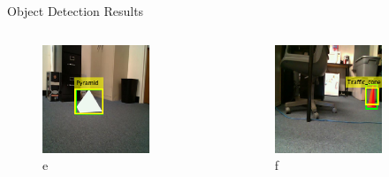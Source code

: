 \documentclass[10pt]{beamer}
\begin{document}
\begin{frame}{Object Detection Results}
\begin{columns}
\begin{figure}
         \includegraphics[width=0.75\textwidth]{Images/tt5.png}
         \caption{e}
     \end{figure}
     \vspace{-10pt}
     \begin{figure}
         \centering
         \includegraphics[width=0.75\textwidth]{Images/tt6.png}
         \caption{f}
     \end{figure}  
\end{columns}   
\end{frame}
\end{document}
